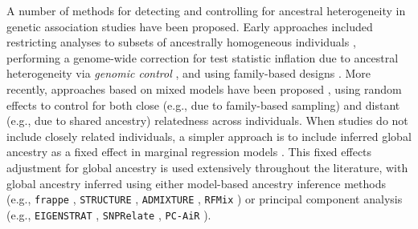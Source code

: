 \documentclass[12pt]{article}
\begin{document}
A number of methods for detecting and controlling for ancestral heterogeneity in genetic association studies have been proposed. 
Early approaches included restricting analyses to subsets of ancestrally homogeneous individuals \citep{lander1994}, performing a genome-wide correction for test statistic inflation due to ancestral heterogeneity via \textit{genomic control} \citep{GenomicControl}, and using family-based designs \citep{tdt}. 
More recently, approaches based on mixed models have been proposed \citep{yu2006, kang2010, yang2014}, using random effects to control for both close (e.g., due to family-based sampling) and distant (e.g., due to shared ancestry) relatedness across individuals.
When studies do not include closely related individuals, a simpler approach is to include inferred global ancestry as a fixed effect in marginal regression models \citep{eigenstrat, pritchard2000}. 
This fixed effects adjustment for global ancestry is used extensively throughout the literature, with global ancestry inferred using either model-based ancestry inference methods (e.g., \texttt{frappe} \citep{tang2005}, \texttt{STRUCTURE} \cite{structure}, \texttt{ADMIXTURE} \citep{admixture}, \texttt{RFMix} \citep{rfmix}) or principal component analysis (e.g., \texttt{EIGENSTRAT} \citep{eigenstrat}, \texttt{SNPRelate} \citep{snprelate}, \texttt{PC-AiR} \citep{conomos2015}).

\end{document}
